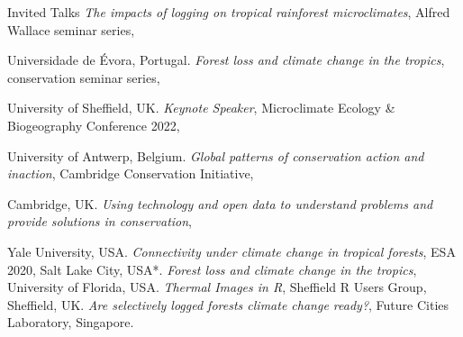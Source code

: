 \begin{rubric}{Invited Talks}
\entry*[2023] \emph{The impacts of logging on tropical rainforest microclimates}, Alfred Wallace seminar series, \par Universidade de Évora, Portugal.
\entry*[2022] \emph{Forest loss and climate change in the tropics}, conservation seminar series, \par University of Sheffield, UK.
\entry*[2022] \emph{Keynote Speaker}, Microclimate Ecology \& Biogeography Conference 2022, \par University of Antwerp, Belgium.
\entry*[2022] \emph{Global patterns of conservation action and inaction}, Cambridge Conservation Initiative, \par Cambridge, UK.
\entry*[2021] \emph{Using technology and open data to understand problems and provide solutions in conservation}, \par Yale University, USA.
\entry*[2021] \emph{Connectivity under climate change in tropical forests}, ESA 2020, Salt Lake City, USA*.
\entry*[2019] \emph{Forest loss and climate change in the tropics}, University of Florida, USA.
\entry*[2017] \emph{Thermal Images in R}, Sheffield R Users Group, Sheffield, UK.
\entry*[2016] \emph{Are selectively logged forests climate change ready?}, Future Cities Laboratory, Singapore.
\end{rubric}
